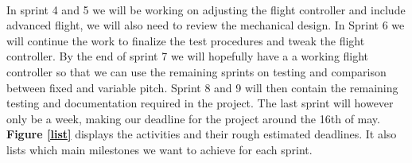 \\
In sprint 4 and 5 we will be working on adjusting the flight controller and include advanced flight, we will also need to review the mechanical design. 
In Sprint 6 we will continue the work to finalize the test procedures and tweak the flight controller. By the end of sprint 7 we will hopefully have a a working flight controller so that we can use the remaining sprints on testing and comparison between fixed and variable pitch. 
Sprint 8 and 9 will then contain the remaining testing and documentation required in the project. The last sprint will however only be a week, making our deadline for the project around the 16th of may. 
\textbf{Figure \ref{list}} displays the activities and their rough estimated deadlines. It also lists which main milestones we want to achieve for each sprint. 
\\


